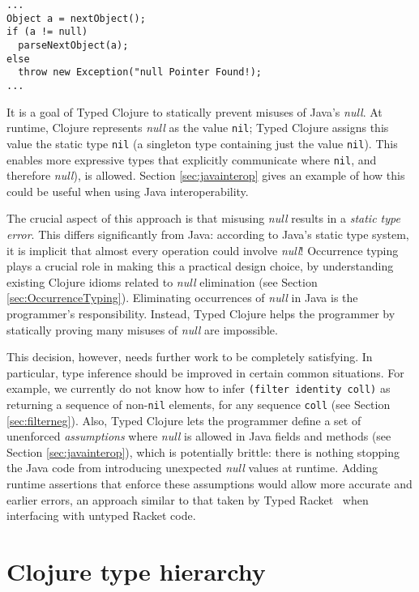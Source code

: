 \begin{lstlisting}[caption=null elimination in Java, label=lst:nullelim]
...
Object a = nextObject();
if (a != null)
  parseNextObject(a);
else
  throw new Exception("null Pointer Found!);
...
\end{lstlisting}

It is a goal of Typed Clojure to statically prevent misuses of Java's \emph{null}.
At runtime, Clojure represents \emph{null} as the value \lstinline|nil|;
Typed Clojure assigns this value the static type \lstinline|nil|
(a singleton type containing just the value \lstinline|nil|).
This enables more expressive types that explicitly communicate where \lstinline|nil|,
and therefore \emph{null}), is allowed.
Section \ref{sec:javainterop} gives an example of how this could be useful 
when using Java interoperability.

The crucial aspect of this approach is that misusing \emph{null} results in a \emph{static type error}.
This differs significantly from Java: according to Java's static type system,
it is implicit that almost every operation could involve \emph{null}!
Occurrence typing~\cite{TF10} plays a crucial role in making this a practical
design choice, by understanding existing Clojure idioms related to \emph{null} elimination (see Section \ref{sec:OccurrenceTyping}).
Eliminating occurrences of \emph{null} in Java is the programmer's responsibility.
Instead, Typed Clojure helps the programmer by statically proving many misuses of \emph{null} are impossible.

This decision, however, needs further work to be completely satisfying.
In particular, type inference should be improved in certain common situations.
For example, we currently do not know how to infer \lstinline|(filter identity coll)|
as returning a sequence of non-\lstinline|nil| elements, for any sequence \lstinline|coll|
(see Section \ref{sec:filterneg}).
Also, Typed Clojure lets the programmer define a set of unenforced \emph{assumptions}
where \emph{null} is allowed in Java fields and methods (see Section \ref{sec:javainterop}),
which is potentially brittle: there is nothing stopping the Java code from introducing unexpected \emph{null} values at runtime.
Adding runtime assertions that enforce these assumptions would allow more
accurate and earlier errors, an approach similar to that taken by Typed Racket~\cite{Tob10} when
interfacing with untyped Racket code.

\section{Clojure type hierarchy}

